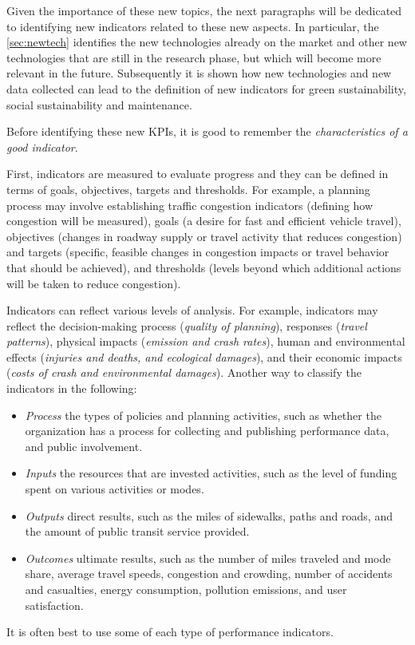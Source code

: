 Given the importance of these new topics, the next paragraphs will be dedicated to identifying new indicators related to these new aspects. In particular, the \ref{sec:newtech} identifies the new technologies already on the market and other new technologies that are still in the research phase, but which will become more relevant in the future. Subsequently it is shown how new technologies and new data collected can lead to the definition of new indicators for green sustainability, social sustainability and maintenance.

Before identifying these new KPIs, it is good to remember the \emph{characteristics of a good indicator}.

First, indicators are measured to evaluate progress and they can be defined in terms of goals, objectives, targets and thresholds. For example, a planning process may involve establishing traffic congestion indicators (defining how congestion will be measured), goals (a desire for fast and efficient vehicle travel), objectives (changes in roadway supply or travel activity that reduces congestion) and targets (specific, feasible changes in congestion impacts or travel behavior that should be achieved), and thresholds (levels beyond which additional actions will be taken to reduce congestion).

Indicators can reflect various levels of analysis. For example, indicators may reflect the decision-making process (\textit{quality of planning}), responses (\textit{travel patterns}), physical impacts (\textit{emission and crash rates}), human and environmental effects (\textit{injuries and deaths, and ecological damages}), and their economic impacts (\textit{costs of crash and environmental damages}).
\newpage
Another way to classify the indicators in the following:
\begin{itemize}
    \item \emph{Process} the types of policies and planning activities, such as whether the organization has a process for collecting and publishing performance data, and public involvement.
    \item \emph{Inputs} the resources that are invested activities, such as the level of funding spent on various activities or modes.
    \item \emph{Outputs} direct results, such as the miles of sidewalks, paths and roads, and the amount of public transit service provided.
    \item \emph{Outcomes} ultimate results, such as the number of miles traveled and mode share, average travel speeds, congestion and crowding, number of accidents and casualties, energy consumption, pollution emissions, and user satisfaction.
\end{itemize}
It is often best to use some of each type of performance indicators. 

